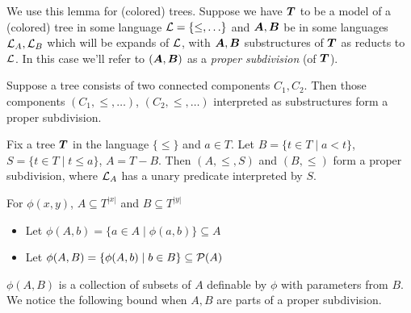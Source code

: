 \documentclass{amsart}
\DeclareMathOperator{\TT}{\boldface T}
\DeclareMathOperator{\A}{\boldface A}
\DeclareMathOperator{\B}{\boldface B}
\begin{document}
We use this lemma for (colored) trees. Suppose we have $\TT$ to be a model of a (colored) tree in some language $\mathcal L = \{\leq, \ldots\}$ and $\A, \B$ be in some languages $\mathcal L_A, \mathcal L_B$ which will be expands of $\mathcal L$, with $\A, \B$ substructures of $\TT$ as reducts to $\mathcal L$. In this case we'll refer to $(\A, \B)$ as a \emph{proper subdivision} (of $\TT$).

\begin{Example} \label{ex_disc}
	Suppose a tree consists of two connected components $C_1, C_2$. Then those components $(C_1, \leq, \ldots)$, $(C_2, \leq, \ldots)$ interpreted as substructures form a proper subdivision.
\end{Example}


\begin{Example} \label{ex_cone}
	Fix a tree $\TT$ in the language $\{\leq\}$ and $a \in T$. Let $B = \{t \in T \mid a < t\}$, $S = \{t \in T \mid t \leq a\}$, $A = T - B$. Then $(A, \leq, S)$ and $(B, \leq)$ form a proper subdivision, where $\mathcal L_A$ has a unary predicate interpreted by $S$.
\end{Example}

\begin{Definition} For $\phi(x, y)$, $A \subseteq T^{|x|}$ and $B \subseteq T^{|y|}$
\begin{itemize}
	\item Let $\phi(A, b) = \{a \in A \mid \phi(a, b)\} \subseteq A$
	\item Let $\phi(A, B) = \{\phi(A, b) \mid b \in B\} \subseteq \mathcal P(A)$	
\end{itemize}
\end{Definition}
$\phi(A, B)$ is a collection of subsets of $A$ definable by $\phi$ with parameters from $B$. We notice the following bound when $A, B$ are parts of a proper subdivision.
\end{document}
